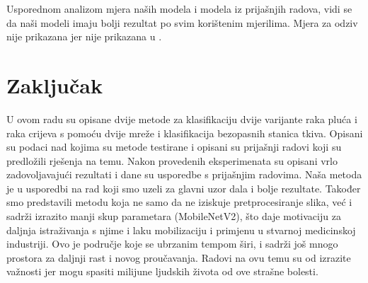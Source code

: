 \documentclass[conference, utf8]{IEEEtran}
\begin{document}
	Usporednom analizom mjera naših modela i modela iz prijašnjih radova, vidi se da naši modeli imaju bolji rezultat po svim korištenim mjerilima. Mjera za odziv nije prikazana jer nije prikazana u \cite{RAD2}.
	
	
	\section{Zaključak}
	U ovom radu su opisane dvije metode za klasifikaciju dvije varijante raka pluća i raka crijeva s pomoću dvije mreže i klasifikacija bezopasnih stanica tkiva. Opisani su podaci nad kojima su metode testirane i opisani su prijašnji radovi koji su predložili rješenja na temu. Nakon provedenih eksperimenata su opisani vrlo zadovoljavajući rezultati i dane su usporedbe s prijašnjim radovima. Naša metoda je u usporedbi na rad koji smo uzeli za glavni uzor dala i bolje rezultate. Također smo predstavili metodu koja ne samo da ne iziskuje pretprocesiranje slika, već i sadrži izrazito manji skup parametara (MobileNetV2), što daje motivaciju za daljnja istraživanja s njime i laku mobilizaciju i primjenu u stvarnoj medicinskoj industriji. Ovo je područje koje se ubrzanim tempom širi, i sadrži još mnogo prostora za daljnji rast i novog proučavanja. Radovi na ovu temu su od izrazite važnosti jer mogu spasiti milijune ljudskih života od ove strašne bolesti.
	
	
	
\end{document}
